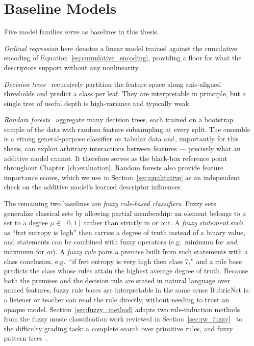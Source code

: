 \section{Baseline Models}
\label{sec:prelim_baselines}
Five model families serve as baselines in this thesis.

\emph{Ordinal regression} here denotes a linear model trained against the cumulative encoding of Equation~\ref{eq:cumulative_encoding}, providing a floor for what the descriptors support without any nonlinearity.

\emph{Decision trees}~\cite{breiman1984classification} recursively partition the feature space along axis-aligned thresholds and predict a class per leaf. They are interpretable in principle, but a single tree of useful depth is high-variance and typically weak.

\emph{Random forests}~\cite{breiman2001random} aggregate many decision trees, each trained on a bootstrap sample of the data with random feature subsampling at every split. The ensemble is a strong general-purpose classifier on tabular data and, importantly for this thesis, can exploit arbitrary interactions between features --- precisely what an additive model cannot. It therefore serves as the black-box reference point throughout Chapter~\ref{ch:evaluation}. Random forests also provide feature importance scores, which we use in Section~\ref{sec:qualitative} as an independent check on the additive model's learned descriptor influences.

The remaining two baselines are \emph{fuzzy rule-based classifiers}. Fuzzy sets~\cite{zadeh1965fuzzy} generalize classical sets by allowing partial membership: an element belongs to a set to a degree $\mu \in [0, 1]$ rather than strictly in or out. A \emph{fuzzy statement} such as ``fret entropy is high'' then carries a degree of truth instead of a binary value, and statements can be combined with fuzzy operators (e.g.\ minimum for \emph{and}, maximum for \emph{or}). A \emph{fuzzy rule} pairs a premise built from such statements with a class conclusion, e.g.\ ``if fret entropy is very high then class 7,'' and a rule base predicts the class whose rules attain the highest average degree of truth. Because both the premises and the decision rule are stated in natural language over named features, fuzzy rule bases are interpretable in the same sense RubricNet is: a listener or teacher can read the rule directly, without needing to trust an opaque model. Section~\ref{sec:fuzzy_method} adapts two rule-induction methods from the fuzzy music classification work reviewed in Section~\ref{sec:rw_fuzzy}~\cite{heerde2020comparing, vatolkin2015interpretable} to the difficulty grading task: a complete search over primitive rules, and fuzzy pattern trees~\cite{senge2011topdown, senge2015fast, huang2008patterntrees}.
